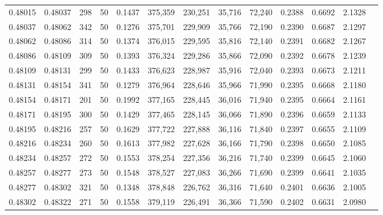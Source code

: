 \begin{tabular}{rrrrrrrrrrrrr}
0.48015 & 0.48037 &   298 &  50 &                                     0.1437 & 375,359 & 230,251 &  35,716 &  72,240 & 0.2388 & 0.6692 & 2.1328 \\
0.48037 & 0.48062 &   342 &  50 &                                     0.1276 & 375,701 & 229,909 &  35,766 &  72,190 & 0.2390 & 0.6687 & 2.1297 \\
0.48062 & 0.48086 &   314 &  50 &                                     0.1374 & 376,015 & 229,595 &  35,816 &  72,140 & 0.2391 & 0.6682 & 2.1267 \\
0.48086 & 0.48109 &   309 &  50 &                                     0.1393 & 376,324 & 229,286 &  35,866 &  72,090 & 0.2392 & 0.6678 & 2.1239 \\
0.48109 & 0.48131 &   299 &  50 &                                     0.1433 & 376,623 & 228,987 &  35,916 &  72,040 & 0.2393 & 0.6673 & 2.1211 \\
0.48131 & 0.48154 &   341 &  50 &                                     0.1279 & 376,964 & 228,646 &  35,966 &  71,990 & 0.2395 & 0.6668 & 2.1180 \\
0.48154 & 0.48171 &   201 &  50 &                                     0.1992 & 377,165 & 228,445 &  36,016 &  71,940 & 0.2395 & 0.6664 & 2.1161 \\
0.48171 & 0.48195 &   300 &  50 &                                     0.1429 & 377,465 & 228,145 &  36,066 &  71,890 & 0.2396 & 0.6659 & 2.1133 \\
0.48195 & 0.48216 &   257 &  50 &                                     0.1629 & 377,722 & 227,888 &  36,116 &  71,840 & 0.2397 & 0.6655 & 2.1109 \\
0.48216 & 0.48234 &   260 &  50 &                                     0.1613 & 377,982 & 227,628 &  36,166 &  71,790 & 0.2398 & 0.6650 & 2.1085 \\
0.48234 & 0.48257 &   272 &  50 &                                     0.1553 & 378,254 & 227,356 &  36,216 &  71,740 & 0.2399 & 0.6645 & 2.1060 \\
0.48257 & 0.48277 &   273 &  50 &                                     0.1548 & 378,527 & 227,083 &  36,266 &  71,690 & 0.2399 & 0.6641 & 2.1035 \\
0.48277 & 0.48302 &   321 &  50 &                                     0.1348 & 378,848 & 226,762 &  36,316 &  71,640 & 0.2401 & 0.6636 & 2.1005 \\
0.48302 & 0.48322 &   271 &  50 &                                     0.1558 & 379,119 & 226,491 &  36,366 &  71,590 & 0.2402 & 0.6631 & 2.0980 \\

\end{tabular}
